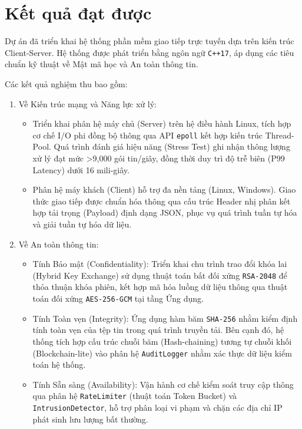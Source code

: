 \section{Kết quả đạt được}

Dự án đã triển khai hệ thống phần mềm giao tiếp trực tuyến dựa trên kiến trúc Client-Server. Hệ thống được phát triển bằng ngôn ngữ \texttt{C++17}, áp dụng các tiêu chuẩn kỹ thuật về Mật mã học và An toàn thông tin.

Các kết quả nghiệm thu bao gồm:

\begin{enumerate}[label=\arabic*.]
    \item Về Kiến trúc mạng và Năng lực xử lý:
    \begin{itemize}[label={-}]
        \item Triển khai phân hệ máy chủ (Server) trên hệ điều hành Linux, tích hợp cơ chế I/O phi đồng bộ thông qua API \texttt{epoll} kết hợp kiến trúc Thread-Pool. Quá trình đánh giá hiệu năng (Stress Test) ghi nhận thông lượng xử lý đạt mức >9,000 gói tin/giây, đồng thời duy trì độ trễ biên (P99 Latency) dưới 16 mili-giây.
        \item Phân hệ máy khách (Client) hỗ trợ đa nền tảng (Linux, Windows). Giao thức giao tiếp được chuẩn hóa thông qua cấu trúc Header nhị phân kết hợp tải trọng (Payload) định dạng JSON, phục vụ quá trình tuần tự hóa và giải tuần tự hóa dữ liệu.
    \end{itemize}

    \item Về An toàn thông tin:
    \begin{itemize}[label={-}]
        \item Tính Bảo mật (Confidentiality): Triển khai chu trình trao đổi khóa lai (Hybrid Key Exchange) sử dụng thuật toán bất đối xứng \texttt{RSA-2048} để thỏa thuận khóa phiên, kết hợp mã hóa luồng dữ liệu thông qua thuật toán đối xứng \texttt{AES-256-GCM} tại tầng Ứng dụng.
        \item Tính Toàn vẹn (Integrity): Ứng dụng hàm băm \texttt{SHA-256} nhằm kiểm định tính toàn vẹn của tệp tin trong quá trình truyền tải. Bên cạnh đó, hệ thống tích hợp cấu trúc chuỗi băm (Hash-chaining) tương tự chuỗi khối (Blockchain-lite) vào phân hệ \texttt{AuditLogger} nhằm xác thực dữ liệu kiểm toán hệ thống.
        \item Tính Sẵn sàng (Availability): Vận hành cơ chế kiểm soát truy cập thông qua phân hệ \texttt{RateLimiter} (thuật toán Token Bucket) và \texttt{IntrusionDetector}, hỗ trợ phân loại vi phạm và chặn các địa chỉ IP phát sinh lưu lượng bất thường.
    \end{itemize}


\end{enumerate}
